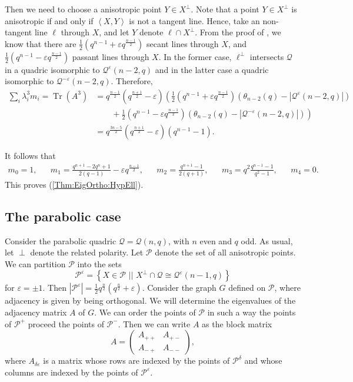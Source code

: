 \documentclass[a4paper]{article}
\theoremstyle{definition}
\newcommand{\eps}{\varepsilon}
\newcommand{\vspan}[1]{\left \langle #1 \right \rangle}
\newcommand{\sett}[2]{ \left\{ #1 \, \, || \, \, #2 \right \} }
\newcommand{\pp}{\mathcal P}
\newcommand{\mq}{\mathcal Q}
\DeclareMathOperator{\Tr}{Tr}
\newcommand{\sam}[1]{\textcolor{purple}{#1}}
\newcommand{\maarten}[1]{\textcolor{orange}{#1}}
\begin{document}
 Then we need to choose a anisotropic point $Y \in X^\perp$.
 Note that a point $Y \in X^\perp$ is anisotropic if and only if $\vspan{X,Y}$ is not a tangent line.
 Hence, take an non-tangent line $\ell$ through $X$, and let $Y$ denote $\ell \cap X^\perp$.
 From the proof of , we know that there are $\frac 12 \left( q^{n-1}+\eps q^\frac{n-1}2 \right)$ secant lines through $X$, and $\frac 12 \left( q^{n-1}-\eps q^\frac{n-1}2 \right)$ passant lines through $X$.
 In the former case, $\ell^\perp$ intersects $\mq$ in a quadric isomorphic to $\mq^\eps(n-2,q)$ and in the latter case a quadric isomorphic to $\mq^{-\eps}(n-2,q)$.
 Therefore,
 \begin{align*}
  \sum_i \lambda_i^3 m_i = \Tr(A^3) &=  q^\frac{n-1}2 \left( q^\frac{n+1}2 - \eps \right) \left( \frac 12 \left( q^{n-1}+\eps q^\frac{n-1}2 \right) \left( \theta_{n-2}(q) - | \mq^\eps(n-2,q) | \right)\right. \\
  & \qquad+ \left.\frac 12 \left( q^{n-1}-\eps q^\frac{n-1}2 \right) \left( \theta_{n-2}(q) - | \mq^{-\eps}(n-2,q) | \right) \right) \\
  &=  q^\frac{3n-5}2 \left( q^\frac{n+1}2 - \eps \right) \left( q^{n-1} - 1 \right).
 \end{align*}

It follows that
\begin{align*}
 m_0 = 1, &&
 m_1 = \frac{q^{n+1} - 2q^n + 1}{2(q-1)} - \eps q^\frac{n-1}2, &&
 m_2 = \frac{q^{n+1}-1}{2(q+1)}, &&
 m_3 = q^2 \frac{q^{n-1}-1}{q^2-1}, &&
 m_4 = 0.
\end{align*}
This proves  (\ref{Thm:EigOrtho:HypEll}).

\subsection{The parabolic case}

Consider the parabolic quadric $\mq = \mq(n,q)$, with $n$ even and $q$ odd.
As usual, let $\perp$ denote the related polarity.
Let $\pp$ denote the set of all anisotropic points.
We can partition $\pp$ into the sets
\[
 \pp^\eps = \sett{ X \in \pp }{ X^\perp \cap \mq \cong \mq^\eps(n-1,q) }
\]
for $\eps = \pm 1$.
Then $|\pp^\eps| = \frac 12 q^\frac n2 \left( q^\frac n2 + \eps \right)$.
Consider the graph $G$ defined on $\pp$, where adjacency is given by being orthogonal.
We will determine the eigenvalues of the adjacency matrix $A$ of $G$.
We can order the points of $\pp$ in such a way the points of $\pp^+$ proceed the points of $\pp^-$.
Then we can write $A$ as the block matrix
\[
 A = \begin{pmatrix}
  A_{++} & A_{+-} \\ A_{-+} & A_{--}
 \end{pmatrix},
\]
where $A_{\delta\eps}$ is a matrix whose rows are indexed by the points of $\pp^\delta$ and whose columns are indexed by the points of $\pp^\eps$.
\end{document}
